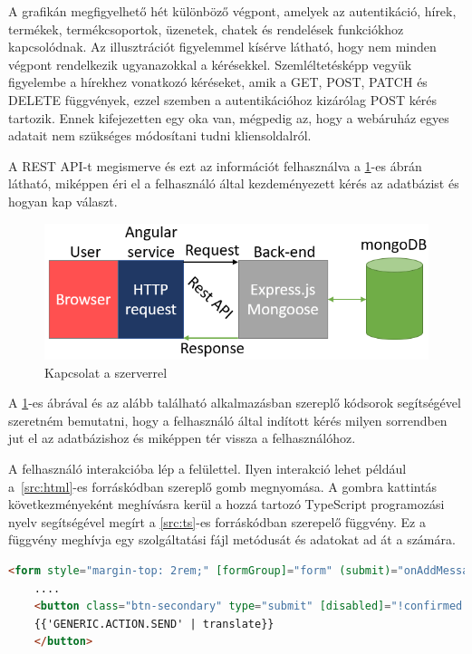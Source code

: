 A grafikán megfigyelhető hét különböző végpont, amelyek az autentikáció, hírek, termékek, termékcsoportok, üzenetek, chatek és rendelések funkciókhoz kapcsolódnak. Az illusztrációt figyelemmel kísérve látható, hogy nem minden végpont rendelkezik ugyanazokkal a kérésekkel. Szemléltetésképp vegyük figyelembe a hírekhez vonatkozó kéréseket, amik a GET, POST, PATCH és DELETE függvények, ezzel szemben a autentikációhoz kizárólag POST kérés tartozik. Ennek kifejezetten egy oka van, mégpedig az, hogy a webáruház egyes adatait nem szükséges módosítani tudni kliensoldalról.

\bigskip
A REST API-t megismerve és ezt az információt felhasználva a \ref{fig.picture-9}-es ábrán látható, miképpen éri el a felhasználó által kezdeményezett kérés az adatbázist és hogyan kap választ.

\begin{figure}[H]
	\centering
	\includegraphics[width=1.0\textwidth]{images/kapcsolat_szerver_bemutatas.png}
	\caption{Kapcsolat a szerverrel}
	\label{fig.picture-9}
\end{figure}

A \ref{fig.picture-9}-es ábrával és az alább található alkalmazásban szereplő kódsorok segítségével szeretném bemutatni, hogy a felhasználó által indított kérés milyen sorrendben jut el az adatbázishoz és miképpen tér vissza a felhasználóhoz.

\bigskip
A felhasználó interakcióba lép a felülettel. Ilyen interakció lehet például a~\ref{src:html}-es forráskódban szereplő gomb megnyomása. A gombra kattintás következményeként meghívásra kerül a hozzá tartozó TypeScript programozási nyelv segítségével megírt a \ref{src:ts}-es forráskódban szerepelő függvény. Ez a függvény meghívja egy szolgáltatási fájl metódusát és adatokat ad át a számára.

\begin{lstlisting}[language=html]
	<form style="margin-top: 2rem;" [formGroup]="form" (submit)="onAddMessage()" *ngIf="!isLoading">
	....
	<button class="btn-secondary" type="submit" [disabled]="!confirmed.checked">
	{{'GENERIC.ACTION.SEND' | translate}}
	</button>
\end{lstlisting}

